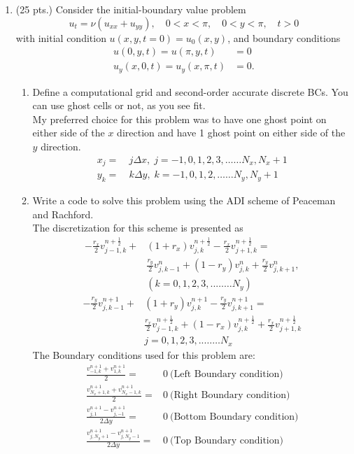 \documentclass[11pt]{article}
\newcommand{\dx}{\Delta x}
\newcommand{\dy}{\Delta y}
\newcommand{\bra}[1]{\left(#1\right)}
\begin{document}
\begin{enumerate}
  \item (25 pts.) Consider the initial-boundary value problem
    \[
      u_{t} = \nu(u_{xx}+u_{yy}), \quad 0<x<\pi, \quad 0<y<\pi, \quad t>0
    \]
    with initial condition $u(x,y,t=0)=u_0(x,y)$, and boundary conditions
    \begin{align*}
      u(0,y,t) = u(\pi,y,t) & = 0 \\
      u_y(x,0,t) = u_y(x,\pi,t) & = 0.
    \end{align*}
    \begin{enumerate}
      \item {\color{red}Define a computational grid and second-order accurate discrete BCs. You can use ghost cells or not, as you see fit.} \\
      My preferred choice for this problem was to have one ghost point on either side of the $x$ direction and have 1 ghost point on either side of the $y$ direction.
      \begin{align*}
      x_j =& \ j\dx, \; j = -1,0,1,2,3,\ldots \ldots N_x, N_x + 1 \\
      y_k =& \ k\dy, \; k = -1,0,1,2,\ldots \ldots N_y, N_y + 1 
      \end{align*}
      \item {\color{red}Write a code to solve this problem using the ADI scheme of Peaceman and Rachford.}  \\
      The discretization for this scheme is presented as
      \begin{align*}
      -\frac{r_x}{2}v^{n+\frac{1}{2}}_{j-1,k} + & \bra{1+r_x}v^{n+\frac{1}{2}}_{j,k} - \frac{r_x}{2}v^{n+\frac{1}{2}}_{j+1,k} =\\
      & \frac{r_y}{2}v^{n}_{j,k-1} + \bra{1-r_y}v^{n}_{j,k} + \frac{r_y}{2}v^{n}_{j,k+1}, \\
      & (k = 0,1,2,3,.. \ldots \ldots N_y)
      \end{align*}
      \begin{align*}
      -\frac{r_y}{2}v^{n+1}_{j,k-1} + &\bra{1+r_y}v^{n+1}_{j,k} -\frac{r_y}{2}v^{n+1}_{j,k+1} = \\
      & \frac{r_x}{2}v^{n+\frac{1}{2}}_{j-1,k} + \bra{1-r_x}v^{n+\frac{1}{2}}_{j,k} + \frac{r_x}{2}v^{n+\frac{1}{2}}_{j+1,k}  \\
      & j = 0,1,2,3,.. \ldots \ldots N_x
      \end{align*}
      The Boundary conditions used for this problem are: 
      \begin{align*}
      \frac{v^{n+1}_{-1,k} + v^{n+1}_{1,k}}{2} =& 0  \ \text{(Left Boundary condition)}\\ 
      \frac{v^{n+1}_{N_x + 1,k} + v^{n+1}_{N_x -1,k}}{2} =& 0 \ \text{(Right Boundary condition)}\\
      \frac{v^{n+1}_{j,1}-v^{n+1}_{j,-1}}{2\dy} =& 0 \ \text{(Bottom Boundary condition)}\\
      \frac{v^{n+1}_{j,N_y +1}-v^{n+1}_{j,N_y -1}}{2\dy} =& 0 \ \text{(Top Boundary condition)}\\
      \end{align*}
      

\end{enumerate}
\end{enumerate}
\end{document}
